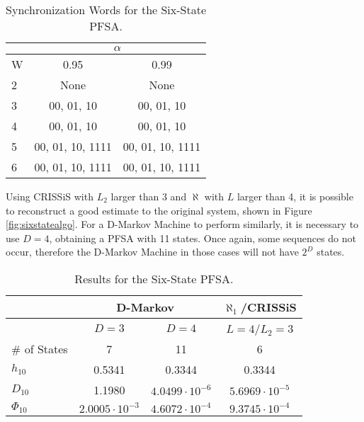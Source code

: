 {\begin{table}
\centering
\caption{Synchronization Words for the Six-State PFSA. \label{tab:tswsynch}}
\begin{tabular}{|l|c|c|}
\hline
 & \multicolumn{2}{c|}{$\alpha$}\\
 \hline
W & 0.95 & 0.99 \\
\hline
2 & None & None \\ 
3 & 00, 01, 10  & 00, 01, 10 \\ 
4 & 00, 01, 10  & 00, 01, 10 \\ 
5 & 00, 01, 10, 1111  & 00, 01, 10, 1111 \\
6 & 00, 01, 10, 1111  & 00, 01, 10, 1111 \\
 \hline
\end{tabular}
\end{table}

Using CRISSiS with $L_2$ larger than 3 and $\aleph$ with $L$ larger than 4, it is possible to reconstruct a good estimate to the original system, shown in Figure \ref{fig:sixstatealgo}. For a D-Markov Machine to perform similarly, it is necessary to use $D=4$, obtaining a PFSA with 11 states. Once again, some sequences do not occur, therefore the D-Markov Machine in those cases will not have $2^D$ states.

\begin{table}
\centering
\caption{Results for the Six-State PFSA. \label{tab:sixstate}}
\begin{tabular}{|l|c|c|c|}
\hline
 & \multicolumn{2}{c|}{D-Markov} & $\aleph_1$/CRISSiS \\
 \hline
 & $D=3$ & $D=4$ & $L=4$/$L_2=3$ \\
\hline
\# of States & 7 & 11 & 6 \\ 
$h_{10}$ & 0.5341 & 0.3344 & 0.3344 \\
$D_{10}$ & 1.1980 & $4.0499\cdot 10^{-6}$ &  $5.6969\cdot10^{-5}$ \\
$\Phi_{10}$ & $2.0005\cdot 10^{-3}$ & $4.6072\cdot 10^{-4}$ & $9.3745\cdot10^{-4}$ \\
 \hline
\end{tabular}
\end{table}


}
